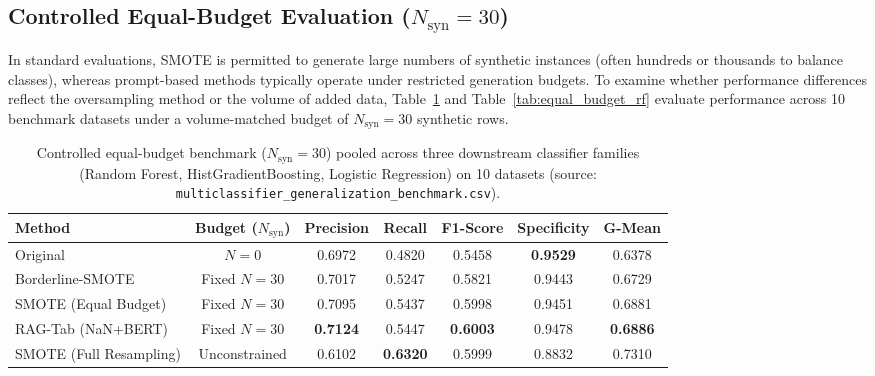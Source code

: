 \documentclass[sn-basic]{sn-jnl}
\begin{document}
\subsection{Controlled Equal-Budget Evaluation ($N_{\text{syn}} = 30$)}
\label{subsec:equal_budget}

In standard evaluations, SMOTE is permitted to generate large numbers of synthetic instances (often hundreds or thousands to balance classes), whereas prompt-based methods typically operate under restricted generation budgets. To examine whether performance differences reflect the oversampling method or the volume of added data, Table~\ref{tab:equal_budget_pooled} and Table~\ref{tab:equal_budget_rf} evaluate performance across 10 benchmark datasets under a volume-matched budget of $N_{\text{syn}} = 30$ synthetic rows.

\begin{table}[t]
\centering
\caption{Controlled equal-budget benchmark ($N_{\text{syn}} = 30$) pooled across three downstream classifier families (Random Forest, HistGradientBoosting, Logistic Regression) on 10 datasets (source: \texttt{multiclassifier\_generalization\_benchmark.csv}).}
\label{tab:equal_budget_pooled}
\begin{tabular}{lcccccc}
\toprule
\textbf{Method} & \textbf{Budget ($N_{\text{syn}}$)} & \textbf{Precision} & \textbf{Recall} & \textbf{F1-Score} & \textbf{Specificity} & \textbf{G-Mean} \\
\midrule
Original & $N = 0$ & 0.6972 & 0.4820 & 0.5458 & \textbf{0.9529} & 0.6378 \\
Borderline-SMOTE & Fixed $N = 30$ & 0.7017 & 0.5247 & 0.5821 & 0.9443 & 0.6729 \\
SMOTE (Equal Budget) & Fixed $N = 30$ & 0.7095 & 0.5437 & 0.5998 & 0.9451 & 0.6881 \\
RAG-Tab (NaN+BERT) & Fixed $N = 30$ & \textbf{0.7124} & 0.5447 & \textbf{0.6003} & 0.9478 & \textbf{0.6886} \\
\midrule
SMOTE (Full Resampling) & Unconstrained & 0.6102 & \textbf{0.6320} & 0.5999 & 0.8832 & 0.7310 \\
\bottomrule
\end{tabular}
\end{table}
\end{document}
